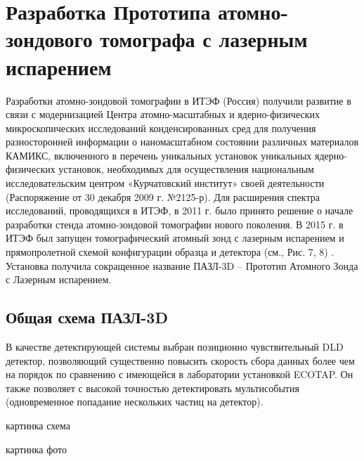 \chapter{Разработка  Прототипа атомно-зондового томографа с лазерным испарением}\label{ch:ch2}

Разработки атомно-зондовой томографии в ИТЭФ (Россия) получили развитие в связи с модернизацией Центра атомно-масштабных и ядерно-физических микроскопических исследований конденсированных сред для получения разносторонней информации о наномасштабном состоянии различных материалов КАМИКС, включенного в перечень уникальных установок уникальных ядерно-физических установок, необходимых для осуществления национальным исследовательским центром «Курчатовский институт» своей деятельности (Распоряжение от 30 декабря 2009 г. №2125-р). Для расширения спектра исследований, проводящихся в ИТЭФ, в 2011 г. было принято решение о начале разработки стенда атомно-зондовой томографии нового поколения. В 2015 г. в ИТЭФ был запущен томографический атомный зонд с лазерным испарением и прямопролетной схемой конфигурации образца и детектора (см., Рис. 7, 8) \cite{scbibAPPLE}. Установка получила сокращенное название ПАЗЛ-3D – Прототип Атомного Зонда с Лазерным испарением. 

\section{Общая схема ПАЗЛ-3D}\label{sec:ch2/sec1}

В качестве детектирующей системы выбран позиционно чувствительный DLD детектор, позволяющий существенно повысить скорость сбора данных более чем на порядок по сравнению с имеющейся в лаборатории установкой ECOTAP. Он также позволяет с высокой точностью детектировать мультисобытия (одновременное попадание нескольких частиц на детектор).

картинка схема

картинка фото


